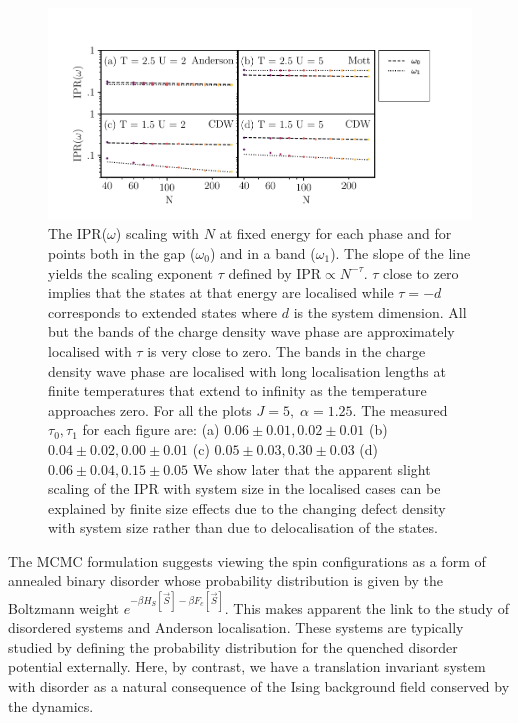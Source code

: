 \hypertarget{fig:IPR_scaling}{%
\begin{figure}
\centering
\includegraphics[width=1\textwidth,height=\textheight]{figure_code/fk_chapter/DOS/IPR_scaling}
\caption[{Scaling of IPR(\(\omega\)) against system size \(N\).}]{The IPR(\(\omega\)) scaling with \(N\) at fixed energy for each phase and for points both in the gap (\(\omega_0\)) and in a band (\(\omega_1\)). The slope of the line yields the scaling exponent \(\tau\) defined by \(\mathrm{IPR} \propto N^{-\tau}\). \(\tau\) close to zero implies that the states at that energy are localised while \(\tau = -d\) corresponds to extended states where \(d\) is the system dimension. All but the bands of the charge density wave phase are approximately localised with \(\tau\) is very close to zero. The bands in the charge density wave phase are localised with long localisation lengths at finite temperatures that extend to infinity as the temperature approaches zero. For all the plots \(J = 5,\;\alpha = 1.25\). The measured \(\tau_0,\tau_1\) for each figure are: (a) \(0.06\pm0.01, 0.02\pm0.01\) (b) \(0.04\pm0.02, 0.00\pm0.01\) (c) \(0.05\pm0.03, 0.30\pm0.03\) (d) \(0.06\pm0.04, 0.15\pm0.05\) We show later that the apparent slight scaling of the IPR with system size in the localised cases can be explained by finite size effects due to the changing defect density with system size rather than due to delocalisation of the states.}
\label{fig:IPR_scaling}
\end{figure}
}

The MCMC formulation suggests viewing the spin configurations as a form of annealed binary disorder whose probability distribution is given by the Boltzmann weight \(e^{-\beta H_S[\vec{S}] - \beta F_c[\vec{S}]}\). This makes apparent the link to the study of disordered systems and Anderson localisation. These systems are typically studied by defining the probability distribution for the quenched disorder potential externally. Here, by contrast, we have a translation invariant system with disorder as a natural consequence of the Ising background field conserved by the dynamics.

